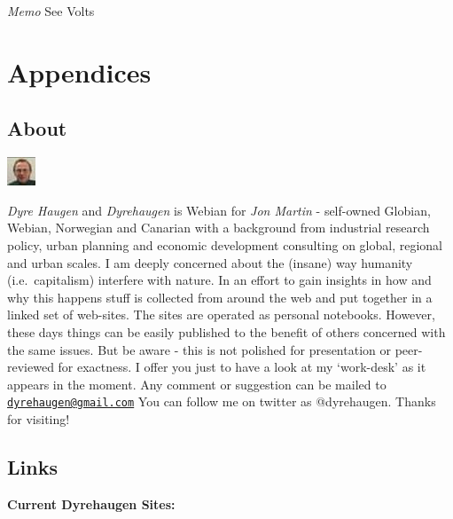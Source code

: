\documentclass[
]{book}
\begin{document}
\emph{Memo} See Volts

\hypertarget{part-appendices}{%
\part{Appendices}\label{part-appendices}}

\hypertarget{appendix-appendices}{%
\appendix}


\hypertarget{about}{%
\chapter{About}\label{about}}

\includegraphics{fig/me.jpg}

\emph{Dyre Haugen} and \emph{Dyrehaugen} is Webian for \emph{Jon Martin} -
self-owned Globian, Webian, Norwegian and Canarian with
a background from industrial research policy, urban planning and
economic development consulting on global, regional and urban scales.
I am deeply concerned about the (insane) way
humanity (i.e.~capitalism) interfere with nature.
In an effort to gain insights in how and why this happens
stuff is collected from around the web and put together
in a linked set of web-sites.
The sites are operated as personal notebooks.
However, these days things can be easily published to the
benefit of others concerned with the same issues.
But be aware - this is not polished for presentation or
peer-reviewed for exactness.
I offer you just to have a look at my `work-desk' as it appears in the moment.
Any comment or suggestion can be mailed to \href{mailto:dyrehaugen@gmail.com}{\nolinkurl{dyrehaugen@gmail.com}}
You can follow me on twitter as @dyrehaugen.
Thanks for visiting!

\hypertarget{links}{%
\chapter{Links}\label{links}}

\textbf{Current Dyrehaugen Sites:}
\end{document}
